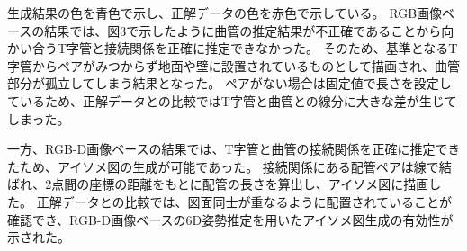 生成結果の色を青色で示し、正解データの色を赤色で示している。
RGB画像ベースの結果では、図3で示したように曲管の推定結果が不正確であることから向かい合うT字管と接続関係を正確に推定できなかった。
そのため、基準となるT字管からペアがみつからず地面や壁に設置されているものとして描画され、曲管部分が孤立してしまう結果となった。
ペアがない場合は固定値で長さを設定しているため、正解データとの比較ではT字管と曲管との線分に大きな差が生じてしまった。

一方、RGB-D画像ベースの結果では、T字管と曲管の接続関係を正確に推定できたため、アイソメ図の生成が可能であった。
接続関係にある配管ペアは線で結ばれ、2点間の座標の距離をもとに配管の長さを算出し、アイソメ図に描画した。
正解データとの比較では、図面同士が重なるように配置されていることが確認でき、RGB-D画像ベースの6D姿勢推定を用いたアイソメ図生成の有効性が示された。





